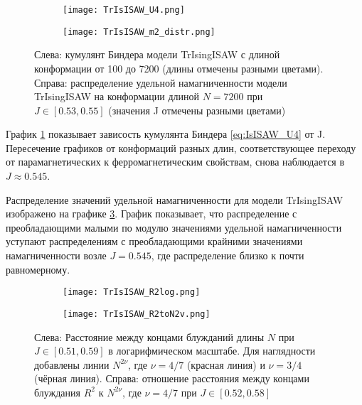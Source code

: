 \begin{figure}[h]
\begin{subfigure}{0.49\textwidth}
\texttt{[image: TrIsISAW\_U4.png]}
\caption{}
\label{fig:TrIsISAW_U4}
\end{subfigure}
\hfill
\begin{subfigure}{0.49\textwidth}
\texttt{[image: TrIsISAW\_m2\_distr.png]}
\caption{}
\label{fig:TrIsISAW_m2_distr}
\end{subfigure}
\caption{Слева: кумулянт Биндера модели TrIsingISAW с длиной конформации от 100 до 7200 (длины отмечены разными цветами).
Справа: распределение удельной намагниченности модели TrIsingISAW на конформации длиной $N=7200$ при $J \in [0.53,0.55]$ (значения J отмечены разными цветами)}
\end{figure}


График \ref{fig:TrIsISAW_U4} показывает зависость кумулянта Биндера \eqref{eq:IsISAW_U4} от J. 
Пересечение графиков от конформаций разных длин, соответствующее переходу от парамагнетических к ферромагнетическим свойствам, снова наблюдается в $J \approx 0.545$.

Распределение значений удельной намагниченности для модели TrIsingISAW изображено на графике \ref{fig:TrIsISAW_m2_distr}.
График показывает, что распределение с преобладающими малыми по модулю значениями удельной намагниченности уступают 
распределениям с преобладающими крайними значениями намагниченности возле $J=0.545$, где распределение близко к почти равномерному.


\begin{figure}[h]
\begin{subfigure}{0.49\textwidth}
\texttt{[image: TrIsISAW\_R2log.png]}
\caption{}
\label{fig:TrIsISAW_R2log}
\end{subfigure}
\hfill
\begin{subfigure}{0.49\textwidth}
\texttt{[image: TrIsISAW\_R2toN2v.png]}
\caption{}
\label{fig:TrIsISAW_R2toN2v}
\end{subfigure}
\caption{Слева: Расстояние между концами блужданий длины $N$ при $J \in [0.51,0.59]$ в логарифмическом масштабе. 
Для наглядности добавлены линии $N^{2\nu}$, где $\nu = 4/7$ (красная линия) и $\nu=3/4$ (чёрная линия).
Справа: отношение расстояния между концами блуждания $R^2$ к $N^{2\nu}$, где $\nu=4/7$ при $J \in [0.52,0.58]$}
\end{figure}

